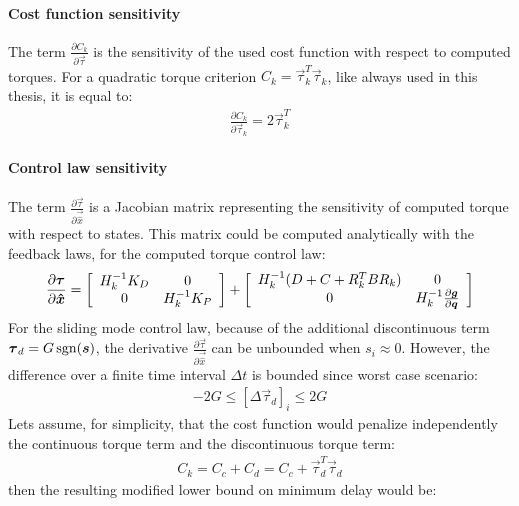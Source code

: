 \paragraph{Cost function sensitivity}
%
The term $\frac{\partial C_k}{\partial \vec{\tau}}$ is the sensitivity of the used cost function with respect to computed torques. For a quadratic torque criterion $C_k = \vec{\tau}_k^T \vec{\tau}_k$, like always used in this thesis, it is equal to:
%
\begin{align}
\frac{\partial C_k}{\partial \vec{\tau}_k} = 2\vec{\tau}_k^T
\end{align}

\paragraph{Control law sensitivity}
%
The term $\frac{\partial \vec{\tau}}{\partial \vec{\hat{x}}}$ is a Jacobian matrix representing the sensitivity of computed torque with respect to states. This matrix could be computed analytically with the feedback laws, for the computed torque control law:
%
\begin{align}
\frac{\partial \vec{\tau}}{\partial \vec{\hat{x}}} = 
\left[ \begin{array}{c c}
	H_k^{-1} K_D & 0 \\ 0 & H_k^{-1} K_P
\end{array} \right] +
\left[ \begin{array}{c c}
	H_k^{-1} ( D + C + R_k^T B R_k ) & 0 \\ 0  & H_k^{-1} \frac{\partial \vec{g}}{\partial \vec{q}}
\end{array} \right] 
\end{align}
%
%
For the sliding mode control law, because of the additional discontinuous term $\vec{\tau}_d = G \sgn( \vec{s} )$, the derivative $\frac{\partial \vec{\tau}}{\partial \vec{\hat{x}}}$ can be unbounded when $s_i \approx 0$. However, the difference over a finite time interval $\Delta t$ is bounded since worst case scenario:
%
\begin{align}
-2G \leq \left[ \Delta \vec{\tau}_d \right]_i \leq 2G
\end{align}
%
Lets assume, for simplicity, that the cost function would penalize independently the continuous torque term and the discontinuous torque term:
%
\begin{align}
C_k = C_{c} + C_{d} = C_{c} + \vec{\tau}_d^T \vec{\tau}_d
\end{align}
%
then the resulting modified lower bound on minimum delay would be:

